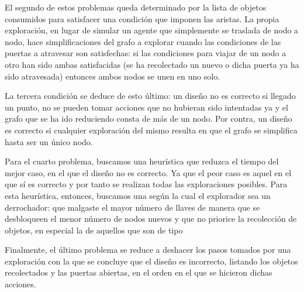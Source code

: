 El segundo de estos problemas queda determinado por la lista de objetos consumidos para satisfacer una condición que imponen las aristas. La propia exploración, en lugar de simular un agente que simplemente se traslada de nodo a nodo, hace simplificaciones del grafo a explorar cuando las condiciones de las puertas a atravesar son satisfechas: si las condiciones para viajar de un nodo a otro han sido ambas satisfacidas (se ha recolectado un nuevo  o dicha puerta ya ha sido atravesada) entonces ambos nodos se unen en uno solo.


La tercera condición se deduce de esto último: un diseño no es correcto si llegado un punto, no se pueden tomar acciones que no hubieran sido intentadas ya y el grafo que se ha ido reduciendo consta de más de un nodo. Por contra, un diseño es correcto si cualquier exploración del mismo resulta en que el grafo se simplifica hasta ser un único nodo.

Para el cuarto problema, buscamos una heurística que reduzca el tiempo del mejor caso, en el que el diseño no es correcto. Ya que el peor caso es aquel en el que sí es correcto y por tanto se realizan todas las exploraciones posibles.
Para esta heurística, entonces, buscamos una según la cual el explorador sea un derrochador: que malgaste el mayor número de llaves de manera que se desbloqueen el menor número de nodos nuevos y que no priorice la recolección de objetos, en especial la de aquellos que son de tipo 

Finalmente, el último problema se reduce a deshacer los pasos tomados por una exploración con la que se concluye que el diseño es incorrecto, listando los objetos recolectados y las puertas abiertas, en el orden en el que se hicieron dichas acciones.